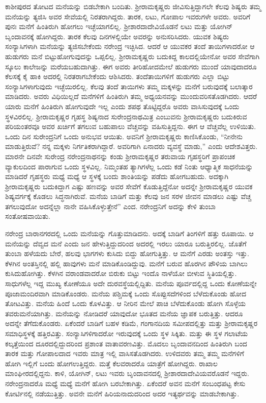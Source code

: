 ಕಾಶೀಪುರದ ತೋಟದ ಮನೆಯನ್ನು ಬಿಡಬೇಕಾಗಿ ಬಂದಿತು. ಶ‍್ರೀರಾಮಕೃಷ್ಣರು ಜೀವಿಸುತ್ತಿದ್ದಾಗಲೇ ಕೆಲವು ಶಿಷ್ಯರು ತಮ್ಮ ಮನೆಯನ್ನು ತ್ಯಜಿಸಿ ಅವರ ಸೇವೆಯಲ್ಲಿ ನಿರತರಾಗಿದ್ದರು. ತಾರಕ, ಲಟು, ಗೋಪಾಲ ಇವರುಗಳೇ ಅವರು. ಅವರಿಗೆ ಪುನಃ ಮನೆಗೆ ಹಿಂತಿರುಗಿ ಹೋಗಲು ಇಚ್ಛೆಯಾಗಲಿಲ್ಲ. ಶ‍್ರೀಶಾರದಾದೇವಿಯೊಡನೆ ಲಟು ಮತ್ತು ಯೋಗಿನ್ ಬೃಂದಾವನಕ್ಕೆ ಹೋಗಿದ್ದರು. ತಾರಕ ಕೆಲವು ದಿನಗಳಲ್ಲಿಯೇ ಅವರನ್ನು ಅನುಸರಿಸಿದರು. ಯುವಕ ಶಿಷ್ಯರು ಸಂನ್ಯಾಸಿಗಳಾಗಿ ಮನೆಯನ್ನು ತ್ಯಜಿಸಬೇಕೆಂದು ನರೇಂದ್ರ ಇಚ್ಛಿಸಿದ. ಆದರೆ ಆ ಯುವಕರ ತಂದೆ ತಾಯಿಗಳಾದರೋ ಆ ಹುಡುಗರು ಮನೆ ಬಿಟ್ಟುಹೋಗುವುದನ್ನು ಒಪ್ಪಲಿಲ್ಲ. ಶ‍್ರೀರಾಮಕೃಷ್ಣರು ಬದುಕಿದ್ದ ಕಾಲದಲ್ಲಿಯೇನೋ ಅವರ ಸೇವೆಗಾಗಿ ಸ್ಕೂಲು ಕಾಲೇಜನ್ನು ಮರೆಯಬಹುದಾಗಿತ್ತು. ಈಗ ಅವರು ತೀರಿಹೋದಮೇಲೆ ಹುಡುಗರು ಮುಂದೆ ಯಾವುದಾದರೂ ಕೆಲಸಕ್ಕೆ ಕೈ ಹಾಕಿ ಅದರಲ್ಲಿ ನಿರತರಾಗಬೇಕೆಂದು ಆಶಿಸಿದರು. ತಂದೆತಾಯಿಗಳಿಗೆ ಹುಡುಗರು ಎಲ್ಲಾ ಬಿಟ್ಟು ಸಂನ್ಯಾಸಿಗಳಾಗುವುದು ಇಚ್ಛೆಯಿರಲಿಲ್ಲ. ಕೆಲವು ತಂದೆ ತಾಯಿಗಳು ತಮ್ಮ ಮಕ್ಕಳನ್ನು ಮನೆಗೆ ಬರುವುದಕ್ಕೆ ಬಲಾತ್ಕಾರ ಮಾಡಿದರು. ಅವರು ವಿಧಿಯಿಲ್ಲದೆ ಮನೆಗಳಿಗೆ ಹಿಂತಿರುಗಿ ತಮ್ಮ ಅಧ್ಯಯನವನ್ನು ಮುಂದುವರಿಸತೊಡಗಿದರು. ಆದರೆ ಯಾರು ಮನೆಗೆ ಹಿಂತಿರುಗಿ ಹೋಗುವುದೇ ಇಲ್ಲ ಎಂದು ಶಪಥ ತೊಟ್ಟಿದ್ದರೊ ಅವರು ವಾಸಿಸುವುದಕ್ಕೆ ಒಂದು ಸ್ಥಳವಿರಲಿಲ್ಲ. ಶ‍್ರೀರಾಮಕೃಷ್ಣರ ಗೃಹಸ್ಥ ಶಿಷ್ಯನಾದ ಸುರೇಂದ್ರನಾಥಮಿತ್ರ ಎಂಬುವನು ಶ‍್ರೀರಾಮಕೃಷ್ಣರು ಬದುಕಿರುವ ಪರಿಯಂತರವೂ ಅವರ ಖರ್ಚಿಗೆ ತಗಲುವ ಬಹುಪಾಲು ವೆಚ್ಚವನ್ನು ವಹಿಸುತ್ತಿದ್ದನು. ಈಗ ಆ ವೆಚ್ಚವೆಲ್ಲ ಉಳಿಯಿತು. ಒಂದು ದಿನ ಸುರೇಂದ್ರನಿಗೆ ಒಂದು ಅನುಭವ ಆಯಿತು. ಅವನಿಗೆ ಶ‍್ರೀರಾಮಕೃಷ್ಣರು ಕಾಣಿಸಿಕೊಂಡು, “ನೀನೇನು ಮಾಡುತ್ತಿರುವೆ? ನನ್ನ ಮಕ್ಕಳು ನಿರ್ಗತಿಕರಾಗಿದ್ದಾರೆ. ಅವರಿಗಾಗಿ ಏನಾದರು ವ್ಯವಸ್ಥೆ ಮಾಡು,” ಎಂದು ಆದೇಶವಿತ್ತರು. ಮಾರನೇ ದಿನವೇ ಸುರೇಂದ್ರ ನರೇಂದ್ರನಾಥನನ್ನು ಕಂಡು ಶ‍್ರೀರಾಮಕೃಷ್ಣರ ತರುವಾಯ ಗೃಹಸ್ಥರಿಗೆ ಪ್ರಾಪಂಚಿಕ ವ್ಯಾಕುಲದಿಂದ ಪಾರಾಗುವ ಒಂದು ಸ್ಥಳವಿಲ್ಲ. ನಿಮ್ಮಂತಹ ತ್ಯಾಗಿಗಳೆಲ್ಲ ಒಂದು ಕಡೆ ನಿಂತು ಆಧ್ಯಾತ್ಮಿಕ ಸಾಧನೆಯನ್ನು ಮಾಡಿದರೆ ಗೃಹಸ್ಥರು ಮಧ್ಯೆ ಮಧ್ಯೆ ಆ ಸ್ಥಳಕ್ಕೆ ಬಂದು ಶಾಂತಿಯನ್ನು ಪಡೆದು ಹೋಗಬಹುದು. ಅದಕ್ಕಾಗಿ ಶ‍್ರೀರಾಮಕೃಷ್ಣರು ಬದುಕಿದ್ದಾಗ ಎಷ್ಟು ಹಣವನ್ನು ಅವರ ಸೇವೆಗೆ ಕೊಡುತ್ತಿದ್ದೆನೋ ಅದನ್ನೇ ಶ‍್ರೀರಾಮಕೃಷ್ಣರ ಯುವಕ ಶಿಷ್ಯವರ್ಗಕ್ಕೆ ಕೊಡಲು ಸಿದ್ಧನಾಗಿರುವೆ. ಮನೆಯ ಬಾಡಿಗೆ ಮತ್ತು ಕೆಲವು ಜನ ಸರಳ ಜೀವನ ಮಾಡಲು ಎಷ್ಟು ವೆಚ್ಚ ತಗಲುವುದೋ ಅದನ್ನೆಲ್ಲಾ ನಾನೇ ವಹಿಸಿಕೊಳ್ಳುತ್ತೇನೆ” ಎಂದ. ನರೇಂದ್ರನಿಗೆ ಅದನ್ನು ಕೇಳಿ ತುಂಬಾ ಸಂತೋಷವಾಯಿತು.

ನರೇಂದ್ರ ಬಾರಾನಗರದಲ್ಲಿ ಒಂದು ಮನೆಯನ್ನು ಗೊತ್ತುಮಾಡಿದನು. ಅದಕ್ಕೆ ಬಾಡಿಗೆ ತಿಂಗಳಿಗೆ ಹತ್ತು ರೂಪಾಯಿ. ಆ ಮನೆಯನ್ನು ದೆವ್ವದ ಮನೆ ಎಂದು ಜನ ಹೇಳುತ್ತಿದ್ದುದರಿಂದ ಅದರಲ್ಲಿ ಇರಲು ಯಾರೂ ಬರುತ್ತಿರಲಿಲ್ಲ. ಜೊತೆಗೆ ತುಂಬಾ ಹಳೆಯದು ಬೇರೆ, ಹಲವು ಭಾಗಗಳು ಕುಸಿದು ಬಿದ್ದು ಹೋಗುತ್ತಿತ್ತು. ಆ ಮನೆಗೆ ಎರಡು ಅಂತಸ್ತು ಇತ್ತು. ಕೆಳಗಿನ ಅಂತಸ್ತಿನಲ್ಲಿ ಹಲ್ಲಿ ಹಾವುಗಳು ಮನೆ ಮಾಡಿಕೊಂಡಿದ್ದುವು. ಮನೆಗೆ ಬರುವ ಹೊರಗಿನ ಪೌಳಿಯ ಬಾಗಿಲು ಕುಸಿದುಹೋಗಿತ್ತು. ಕೆಳಗಿನ ವರಾಂಡವಾದರೋ ಬಿರುಕು ಬಿಟ್ಟು ಇಂದೊ ನಾಳೆಯೋ ಬೀಳುವ ಸ್ಥಿತಿಯಲ್ಲಿತ್ತು. ಸಾಧುಗಳೆಲ್ಲ ಇದ್ದ ಮುಖ್ಯ ಕೋಣೆಯೂ ಅದೇ ದುರವಸ್ಥೆಯಲ್ಲಿದ್ದಿತು. ಮನೆಯ ಪೂರ್ವದಲ್ಲಿದ್ದ ಒಂದು ಕೋಣೆಯನ್ನೇ ಪೂಜಾಮಂದಿರವಾಗಿ ಮಾಡಿಕೊಂಡರು. ಮನೆಯ ಪಶ್ಚಿಮಕ್ಕೆ ಒಂದು ಸೊಪ್ಪುಸದೆಗಳಿಂದ ಬೆಳೆದುಕೊಂಡು ಹೋದ ತೋಟವಿತ್ತು. ಮನೆಯ ಹಿಂದೆ ಒಂದು ಕೊಳವಿತ್ತು. ಆ ನೀರಿನ ಮೇಲೆ ಪಾಚಿ ಬೆಳೆದುಕೊಂಡು ಹೋಗಿ ಸೊಳ್ಳೆಯ ತವರುಮನೆಯಾಗಿತ್ತು. ಮನೆಯನ್ನು ನೋಡಿದರೆ ಯಾವುದೋ ಭೂತದ ಮನೆಯ ಜ್ಞಾಪಕ ಬರುತ್ತಿತ್ತು. ಆದರೂ ಅದನ್ನೇ ತೆಗೆದುಕೊಂಡರು. ಏಕೆಂದರೆ ಬಾಡಿಗೆ ಬಹಳ ಕಡಿಮೆ, ಗಂಗಾನದಿಯ ಸಮೀಪದಲ್ಲಿತ್ತು ಮತ್ತು ಶ‍್ರೀರಾಮಕೃಷ್ಣರ ಸಮಾಧಿಸ್ಥಳಕ್ಕೆ ಹತ್ತಿರವಿತ್ತು. ಸಂನ್ಯಾಸಿಗಳಿಗಾದರೋ ಇರುವುದಕ್ಕೆ ಒಂದು ಸ್ಥಳ ಸಿಕ್ಕಿತು. ಮತ್ತು ಈ ಸ್ಥಳ ಗಲಾಟೆಯ ಕಲ್ಕತ್ತೆಯಿಂದ ದೂರದಲ್ಲಿದ್ದುದರಿಂದ ಪ್ರಶಾಂತ ವಾತಾವರಣವಿತ್ತು. ಮೊದಲು ಬೃಂದಾವನದಿಂದ ಹಿಂತಿರುಗಿ ಬಂದ ತಾರಕ ಮತ್ತು ಗೋಪಾಲದಾದ ಇವರು ಮಾತ್ರ ಇಲ್ಲಿ ವಾಸಿಸತೊಡಗಿದರು. ಉಳಿದವರು ತಮ್ಮ ತಮ್ಮ ಮನೆಗಳಿಗೆ ಹೋಗಿ ಇಲ್ಲಿಗೆ ಬಂದು ಹೋಗಉತ್ತಿದ್ದರು. ಮತ್ತೆ ಕೆಲವರಾದರೊ ಯಾತ್ರೆಗೆ ಹೋಗಿದ್ದರು. ರಾಖಾಲ ಮಾಂಘೀರದಲ್ಲಿದ್ದನು. ಕಾಳಿ, ಯೋಗಿನ್, ಲಟು ಇವರು ಬೃಂದಾವನದಲ್ಲಿ ಶ‍್ರೀಶಾರದಾದೇವಿಯವರೊಡನೆ ಇದ್ದರು. ನರೇಂದ್ರನಾದರೊ ಮಧ್ಯೆ ಮಧ್ಯೆ ಮನೆಗೆ ಹೋಗಿ ಬರಬೇಕಾಗಿತ್ತು. ಏಕೆಂದರೆ ಅವನ ಮನೆಗೆ ಸಂಬಂಧಪಟ್ಟ ಕೇಸು ಕೋರ್ಟಿನಲ್ಲಿ ನಡೆಯುತ್ತಿತ್ತು. ಅವನೇ ಮನೆಗೆ ಹಿರಿಯನಾದುದರಿಂದ ಅದರ ಇತ್ಯರ್ಥವನ್ನು ಮಾಡಬೇಕಾಗಿತ್ತು.


